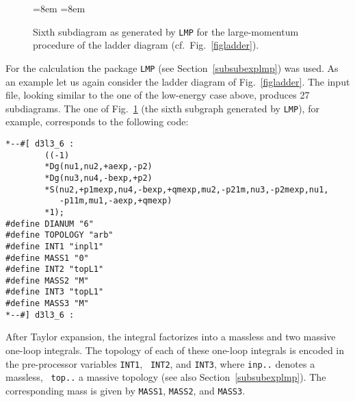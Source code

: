 \begin{figure}[t]
  \begin{center}
  \leavevmode
   \epsfxsize=8em
   \hspace{0em}
   \raisebox{0em}{\Large $\star$}\hspace{1em}
   \epsfxsize=8em
   \parbox{\captionwidth}{
   \caption[]{\label{figsub}
     Sixth subdiagram as generated by {\tt LMP} for the large-momentum
     procedure of the ladder diagram (cf.\ Fig.~\ref{figladder}).  }}
 \end{center}
\end{figure}


For the calculation the package {\tt LMP} (see
Section~\ref{subsubexplmp}) was used.  As an example let us again
consider the ladder diagram of Fig.~\ref{figladder}.  The input file,
looking similar to the one of the low-energy case above, produces 27
subdiagrams.  The one of Fig.~\ref{figsub} (the sixth subgraph generated
by {\tt LMP}), for example, corresponds to the following code:
\begin{verbatim}
*--#[ d3l3_6 :
        ((-1)
        *Dg(nu1,nu2,+aexp,-p2)
        *Dg(nu3,nu4,-bexp,+p2)
        *S(nu2,+p1mexp,nu4,-bexp,+qmexp,mu2,-p21m,nu3,-p2mexp,nu1,
           -p11m,mu1,-aexp,+qmexp)
        *1);
#define DIANUM "6"
#define TOPOLOGY "arb"
#define INT1 "inpl1"
#define MASS1 "0"
#define INT2 "topL1"
#define MASS2 "M"
#define INT3 "topL1"
#define MASS3 "M"
*--#] d3l3_6 :
\end{verbatim}
After Taylor expansion, the integral factorizes into a massless and two
massive one-loop integrals. The topology of each of these one-loop
integrals is encoded in the pre-processor variables {\tt INT1}, {\tt
  INT2}, and {\tt INT3}, where {\tt inp..} denotes a massless, {\tt
  top..} a massive topology (see also Section~\ref{subsubexplmp}). The
corresponding mass is given by {\tt MASS1}, {\tt MASS2}, and {\tt MASS3}.

